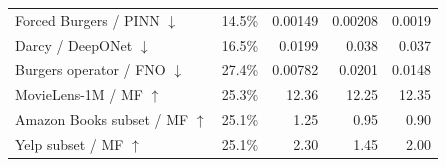 \begin{table}[htbp]
{\begin{tabular}{lrrrr}
Forced Burgers / PINN $\downarrow$  &  14.5\%  &  0.00149  &  \cellcolor{oursbg}0.00208 &  0.0019\\
Darcy / DeepONet $\downarrow$  &  16.5\%  &  0.0199  &  \cellcolor{oursbg}0.038 &  0.037\\
Burgers operator / FNO $\downarrow$  &  27.4\%  &  0.00782  &  \cellcolor{oursbg}0.0201 &  0.0148\\
MovieLens-1M / MF $\uparrow$  &  25.3\%  &  12.36  &  \cellcolor{oursbg}12.25 &  12.35\\
Amazon Books subset / MF $\uparrow$  &  25.1\%  &  1.25  &  \cellcolor{oursbg}0.95 &  0.90\\
Yelp subset / MF $\uparrow$  &  25.1\%  &  2.30  &  \cellcolor{oursbg}1.45 &  2.00\\
\bottomrule\end{tabular}}\end{table}
